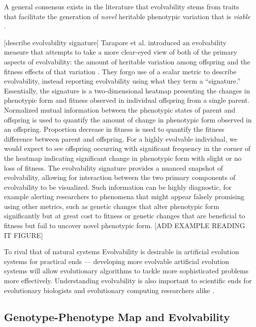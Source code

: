 A general consensus exists in the literature that evolvability stems from traits that facilitate the generation of \textit{novel} heritable phenotypic variation that is \textit{viable} \cite{tarapore2015evolvability}.

[describe evolvability signature]
Tarapore et al. introduced an evolvability measure that attempts to take a more clear-eyed view of both of the primary aspects of evolvability: the amount of heritable variation among offspring and the fitness effects of that variation \cite{tarapore2015evolvability}.
They forgo use of a scalar metric to describe evolvability, instead reporting evolvability using what they term a ``signature.''
Essentially, the signature is a two-dimensional heatmap presenting the changes in phenotypic form and fitness observed in individual offspring from a single parent.
Normalized mutual information between the phenotypic states of parent and offspring is used to quantify the amount of change in phenotypic form observed in an offspring.
Proportion decrease in fitness is used to quantify the fitness difference between parent and offspring.
For a highly evolvable individual, we would expect to see offspring occurring with significant frequency in the corner of the heatmap indicating significant change in phenotypic form with slight or no loss of fitness.
The evolvability signature provides a nuanced snapshot of evolvability, allowing for interaction between the two primary components of evolvability to be visualized.
Such information can be highly diagnostic, for example alerting researchers to phenomena that might appear falsely promising using other metrics, such as genetic changes that alter phenotypic form significantly but at great cost to fitness or genetic changes that are beneficial to fitness but fail to uncover novel phenotypic form.
[ADD EXAMPLE READING IT FIGURE]

To rival that of natural systems
Evolvability is desirable in artificial evolution systems for practical ends --- developing more evolvable artificial evolution systems will allow evolutionary algorithms to tackle more sophisticated problems more effectively.
Understanding evolvability is also important to scientific ends for evolutionary biologists and evolutionary computing researchers alike  \cite{mengistu2016evolvability, pigliucci2008evolvability}.

\subsection{Genotype-Phenotype Map and Evolvability}

